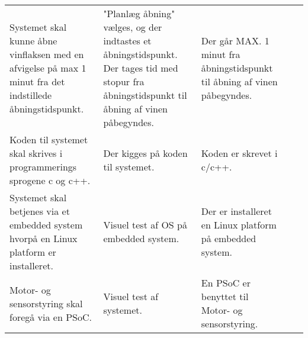 \begin{longtable}{ p{2cm}  p{2cm}  p{2cm}  p{1.5cm} p{2cm} }
	Systemet skal kunne åbne vinflaksen med en afvigelse på max 1 minut fra det indstillede åbningstidspunkt.& "Planlæg åbning" vælges, og der indtastes et åbningstidspunkt. Der tages tid med stopur fra åbningstidspunkt til åbning af vinen påbegyndes.& Der går MAX. 1 minut fra åbningstidspunkt til åbning af vinen påbegyndes. & &\\ 
	  
	Koden til systemet skal skrives i programmerings sprogene c og c++.& Der kigges på koden til systemet.& Koden er skrevet i c/c++. & &\\ 
	
	Systemet skal betjenes via et embedded system hvorpå en Linux platform er installeret.& Visuel test af OS på embedded system.& Der er installeret en Linux platform på embedded system. & &\\ 
	
	Motor- og sensorstyring skal foregå via en PSoC.& Visuel test af systemet.& En PSoC er benyttet til Motor- og sensorstyring.& & \\  



\end{longtable}
